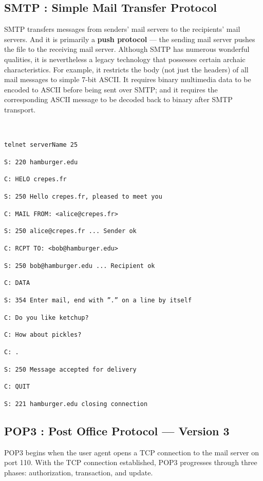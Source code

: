 \documentclass[11pt]{article}
\begin{document}
\subsection{SMTP : Simple Mail Transfer Protocol}

SMTP transfers messages from senders’ mail servers to the recipients’ mail servers.
And it is primarily a \textbf{push protocol} --- the sending mail server pushes the file to the receiving mail server.
Although SMTP has numerous wonderful qualities, it is nevertheless a legacy technology that possesses certain archaic characteristics. For example, it restricts the body (not just the headers) of all mail messages to simple 7-bit ASCII. It requires binary multimedia data to be encoded to ASCII before being sent over SMTP; and it requires the corresponding ASCII message to be decoded back to binary after SMTP transport.

~\

\texttt{telnet serverName 25}

\texttt{S: 220 hamburger.edu}

\texttt{C: HELO crepes.fr}

\texttt{S: 250 Hello crepes.fr, pleased to meet you}

\texttt{C: MAIL FROM: <alice@crepes.fr>}

\texttt{S: 250 alice@crepes.fr ... Sender ok}

\texttt{C: RCPT TO: <bob@hamburger.edu>}

\texttt{S: 250 bob@hamburger.edu ... Recipient ok}

\texttt{C: DATA}

\texttt{S: 354 Enter mail, end with ”.” on a line by itself}

\texttt{C: Do you like ketchup?}

\texttt{C: How about pickles?}

\texttt{C: .}

\texttt{S: 250 Message accepted for delivery}

\texttt{C: QUIT}

\texttt{S: 221 hamburger.edu closing connection}

\subsection{POP3 : Post Office Protocol --- Version 3}

POP3 begins when the user agent opens a TCP connection to the mail server on port 110. With the TCP connection established, POP3 progresses through three phases: authorization, transaction, and update. 
\end{document}

